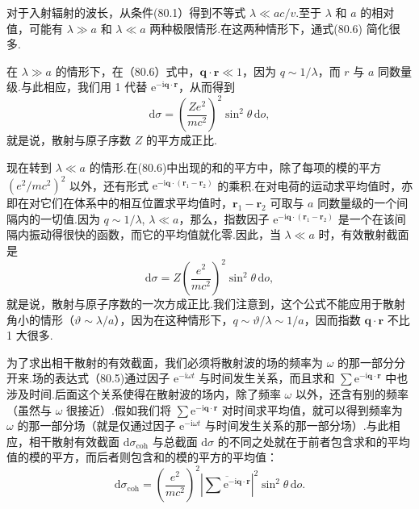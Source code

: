 对于入射辐射的波长，从条件(80.1）得到不等式 $\lambda\ll ac/v$.至于 $\lambda$ 和 $a$ 的相对值，可能有 $\lambda\gg a$ 和 $\lambda\ll a$ 两种极限情形.在这两种情形下，通式(80.6) 简化很多.

在 $\lambda\gg a$ 的情形下，在（80.6）式中，$\boldsymbol{q}\cdot\boldsymbol{r}\ll 1$，因为 $q\sim 1/\lambda$，而 $r$ 与 $a$ 同数量级.与此相应，我们用 1 代替 $\mathrm{e}^{-\mathrm{i}\boldsymbol{q}\cdot\boldsymbol{r}}$，从而得到
\begin{equation}
  \mathrm{d}\sigma=\left(\frac{Ze^2}{mc^2}\right)^{\!2}\sin^2\theta\,\mathrm{d}o,
\end{equation}
就是说，散射与原子序数 $Z$ 的平方成正比.

现在转到 $\lambda\ll a$ 的情形.在(80.6)中出现的和的平方中，除了每项的模的平方 $(e^2/mc^2)^2$ 以外，还有形式 $\mathrm{e}^{-\mathrm{i}\boldsymbol{q}\cdot(\boldsymbol{r}_1-\boldsymbol{r}_2)}$ 的乘积.在对电荷的运动求平均值时，亦即在对它们在体系中的相互位置求平均值时，$\boldsymbol{r}_1-\boldsymbol{r}_2$ 可取与 $a$ 同数量级的一个间隔内的一切值.因为 $q\sim 1/\lambda$, $\lambda\ll a$，那么，指数因子 $\mathrm{e}^{-\mathrm{i}\boldsymbol{q}\cdot(\boldsymbol{r}_1-\boldsymbol{r}_2)}$ 是一个在该间隔内振动得很快的函数，而它的平均值就化零.因此，当 $\lambda\ll a$ 时，有效散射截面是
\begin{equation}
  \mathrm{d}\sigma=Z\left(\frac{e^2}{mc^2}\right)^{\!2}\sin^2\theta\,\mathrm{d}o,
\end{equation}
就是说，散射与原子序数的一次方成正比.我们注意到，这个公式不能应用于散射角小的情形（$\vartheta\sim\lambda/a$），因为在这种情形下，$q\sim\vartheta/\lambda\sim 1/a$，因而指数 $\boldsymbol{q}\cdot\boldsymbol{r}$ 不比 1 大很多.

为了求出相干散射的有效截面，我们必须将散射波的场的频率为 $\omega$ 的那一部分分开来.场的表达式（80.5)通过因子 $\mathrm{e}^{-\mathrm{i}\omega t}$ 与时间发生关系，而且求和 $\sum\mathrm{e}^{-\mathrm{i}\boldsymbol{q}\cdot\boldsymbol{r}}$ 中也涉及时间.后面这个关系使得在散射波的场内，除了频率 $\omega$ 以外，还含有别的频率（虽然与 $\omega$ 很接近）.假如我们将 $\sum\mathrm{e}^{-\mathrm{i}\boldsymbol{q}\cdot\boldsymbol{r}}$ 对时间求平均值，就可以得到频率为 $\omega$ 的那一部分场（就是仅通过因子 $\mathrm{e}^{-\mathrm{i}\omega t}$ 与时间发生关系的那一部分场）.与此相应，相干散射有效截面 $\mathrm{d}\sigma_{\mathrm{coh}}$ 与总截面 $\mathrm{d}\sigma$ 的不同之处就在于前者包含求和的平均值的模的平方，而后者则包含和的模的平方的平均值：
\begin{equation}
  \mathrm{d}\sigma_{\mathrm{coh}}=\left(\frac{e^2}{mc^2}\right)^{\!2}
  \left|\overline{\sum\mathrm{e}^{-\mathrm{i}\boldsymbol{q}\cdot\boldsymbol{r}}}\right|^2
  \sin^2\theta\,\mathrm{d}o.
\end{equation}

